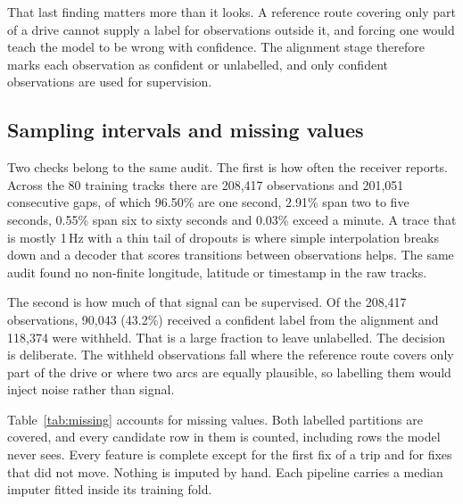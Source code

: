 \documentclass[11pt,a4paper]{article}
\begin{document}
That last finding matters more than it looks. A reference route covering only part of a drive cannot
supply a label for observations outside it, and forcing one would teach the model to be wrong with
confidence. The alignment stage therefore marks each observation as confident or unlabelled, and only
confident observations are used for supervision.

\subsection{Sampling intervals and missing values}

Two checks belong to the same audit. The first is how often the receiver reports. Across the 80
training tracks there are 208,417 observations and 201,051 consecutive gaps, of which 96.50\% are one second, 2.91\% span two to five seconds, 0.55\% span six to sixty seconds and 0.03\% exceed a minute. A trace that is mostly 1\,Hz with a thin tail of dropouts is where
simple interpolation breaks down and a decoder that scores transitions between observations helps. The same audit found no
non-finite longitude, latitude or timestamp in the raw tracks.

The second is how much of that signal can be supervised. Of the 208,417 observations, 90,043 (43.2\%) received a confident label from the alignment and 118,374 were withheld. That is a large fraction to leave unlabelled. The decision is deliberate. The
withheld observations fall where the reference route covers only part of the drive or where two arcs
are equally plausible, so labelling them would inject noise rather than signal.

Table~\ref{tab:missing} accounts for missing values. Both labelled partitions are covered, and every
candidate row in them is counted, including rows the model never sees. Every feature is complete
except for the first fix of a trip and for fixes that did not move. Nothing is imputed by hand. Each
pipeline carries a median imputer fitted inside its training fold.
\end{document}
